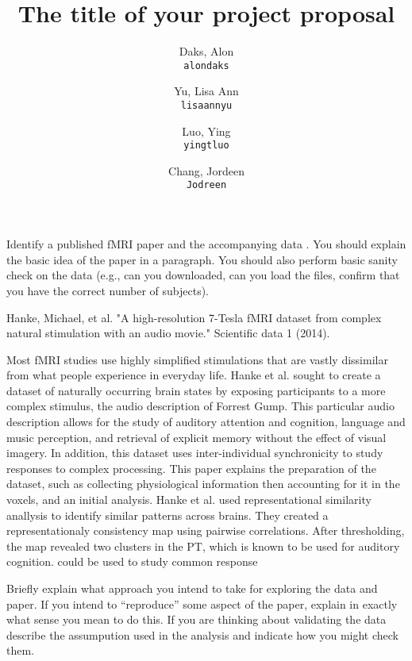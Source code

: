 \documentclass[11pt]{article}
\title{The title of your project proposal}
\author{
  Daks, Alon\\
  \texttt{alondaks}
  \and
  Yu, Lisa Ann\\
  \texttt{lisaannyu}
  \and
  Luo, Ying\\
  \texttt{yingtluo}
  \and
  Chang, Jordeen\\
  \texttt{Jodreen}
}
\begin{document}
\maketitle

Identify a published fMRI paper and the accompanying data
\cite{lindquist2008statistical}.  You should explain the basic idea of the
paper in a paragraph.  You should also perform basic sanity check on the data
(e.g., can you downloaded, can you load the files, confirm that you have the
correct number of subjects).

Hanke, Michael, et al. "A high-resolution 7-Tesla fMRI dataset from complex 
natural stimulation with an audio movie." Scientific data 1 (2014).

Most fMRI studies use highly simplified stimulations that are vastly dissimilar
from what people experience in everyday life.  Hanke et al. sought to create a
dataset of naturally occurring brain states by exposing participants to a 
more complex stimulus, the audio description of Forrest Gump.  This particular
audio description allows for the study of auditory attention and cognition, 
language and music perception, and retrieval of explicit memory without the
effect of visual imagery.  In addition, this dataset uses inter-individual 
synchronicity to study responses to complex processing.  This paper explains
the preparation of the dataset, such as collecting physiological information
then accounting for it in the voxels, and an initial analysis.  Hanke et al.
used representational similarity anallysis to identify similar patterns
across brains.  They created a representationaly consistency map using pairwise
correlations.  After thresholding, the map revealed two clusters in the PT,
which is known to be used for auditory cognition.
could be used to study common response

Briefly explain what approach you intend to take for exploring
the data and paper.  If you intend to ``reproduce'' some aspect of the paper,
explain in exactly what sense you mean to do this.  If you are thinking about
validating the data describe the assumpution used in the analysis and indicate
how you might check them.


\end{document}
